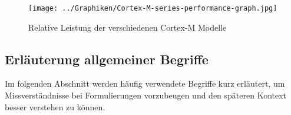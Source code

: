 \begin{description}
	    \begin{figure}[h]
	        \caption{Relative Leistung der verschiedenen Cortex-M Modelle}
	        \label{fig:arm_cortex_m_rel_performance}
            \centering
            \texttt{[image: ../Graphiken/Cortex-M-series-performance-graph.jpg]}
	    \end{figure}

	\end{description}

	\subsection{Erläuterung allgemeiner Begriffe}
	Im folgenden Abschnitt werden häufig verwendete Begriffe kurz erläutert, um Missverständnisse bei
	Formulierungen vorzubeugen und den späteren Kontext besser verstehen zu können.
